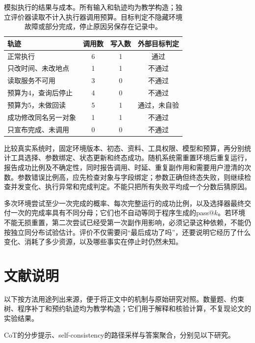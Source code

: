 \begin{table}[htbp]
  \centering
  \begin{tabular}{lccc}
    \toprule
    轨迹 & 调用数 & 写入数 & 外部目标判定 \\
    \midrule
    正常执行 & 6 & 1 & 通过 \\
    只改时间、未改地点 & 1 & 1 & 不通过 \\
    读取服务不可用 & 3 & 0 & 不通过 \\
    预算为4，查询后停止 & 4 & 0 & 不通过 \\
    预算为5，未做回读 & 5 & 1 & 通过，未自验 \\
    成功修改同名另一对象 & 1 & 1 & 不通过 \\
    只宣布完成、未调用 & 0 & 0 & 不通过 \\
    \bottomrule
  \end{tabular}
  \caption{模拟执行的结果与成本。所有输入和轨迹均为教学构造；独立评价器读取不计入执行器调用预算。目标判定不隐藏环境故障或部分完成，停止原因另保存在记录中。}
  \label{tab:nlp-execution-outcomes}
\end{table}
\FloatBarrier

比较真实系统时，固定环境版本、初态、资料、工具权限、模型和预算，再分别统计工具选择、参数绑定、状态更新和终态成功。随机系统需重置环境后重复运行，报告成功比例及不确定性，同时报告调用、时延、重复副作用和需要用户澄清的次数。参数错误比例高，应先检查对象与字段绑定；参数正确但终态失败，则继续检查并发变化、执行异常和完成判定。不能只把所有失败平均成一个分数后猜原因。

多次环境尝试至少一次完成的概率、每次完整运行的成功比例，以及选择器最终交付一次的完成率具有不同分母；它们也不自动等同于程序生成的pass@$k$。若环境不能无损重置，第二次尝试已经受第一次副作用影响，必须记录这种依赖，不能仍按独立同分布试验估计。评价不仅需要问“最后成功了吗”，还要说明它经历了什么变化、消耗了多少资源，以及哪些事实在停止时仍然未知。

\section*{文献说明}
\label{sec:nlp-execution-literature}

以下按方法用途列出来源，便于将正文中的机制与原始研究对照。数量题、约束树、程序补丁和预约轨迹均为教学构造；它们用于解释和核验计算，不复现论文的实验结果。

\begin{fullwidth}
CoT的分步提示、self-consistency的路径采样与答案聚合，分别见以下研究。
\par{}
\par{}
\end{fullwidth}

